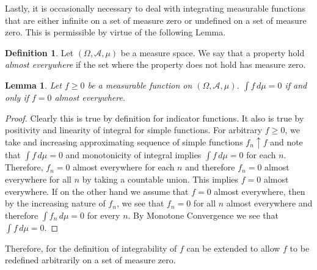 \documentclass{amsart}
\newtheorem{lem}[thm]{Lemma}
\theoremstyle{remark}
\theoremstyle{definition}
\newtheorem{defn}[thm]{Definition}
\begin{document}
Lastly, it is occasionally necessary to deal with integrating
measurable functions that are either infinite on a set of measure zero
or undefined on a set of measure zero.  This is permissible by virtue
of the following Lemma.
\begin{defn}Let $(\Omega,  \mathcal{A}, \mu)$ be a measure space.  We
  say that a property hold \emph{almost everywhere} if the set where
  the property does not hold has measure zero.
\end{defn}
\begin{lem}\label{ZeroIntegralImpliesZeroFunction}Let $f \geq 0$ be a measurable function on $(\Omega,
  \mathcal{A}, \mu)$.  $\int f \, d\mu = 0$ if and only if $f = 0$
  almost everywhere.
\end{lem}
\begin{proof}Clearly this is true by definition for indicator
  functions.  It also is true by positivity and linearity of integral
  for simple functions.  For arbitrary $f\geq 0$, we take and
increasing  approximating sequence of simple functions $f_n \uparrow
f$ and note that $\int f \, d\mu = 0$ and monotonicity of integral
implies $\int f \, d\mu = 0$ for each $n$.  Therefore, $f_n = 0$ almost
everywhere for each $n$ and therefore $f_n = 0$ almost everywhere for
all $n$ by taking a countable union.  This implies $f = 0$ almost
everywhere. 
If on the other hand we assume that $f = 0$ almost
everywhere, then by the increasing nature of $f_n$, we see that $f_n
=0$ for all $n$ almost everywhere and therefore $\int f_n \, d\mu = 0$
for every $n$.  By Monotone Convergence we see that $\int f \, d\mu = 0$.
\end{proof}
Therefore, for the definition of integrability of $f$ can be extended
to allow $f$ to be redefined arbitrarily on a set of measure zero.
 
\end{document}
